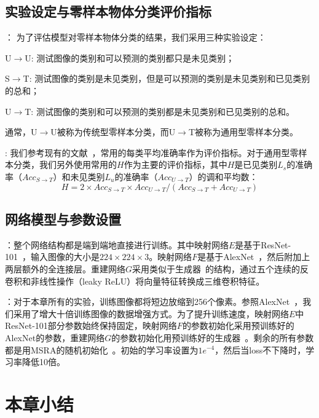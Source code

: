 \subsection{实验设定与零样本物体分类评价指标}
：
为了评估模型对零样本物体分类的结果，我们采用三种实验设定：
\begin{asparaenum}
\item U$\to$U: 测试图像的类别和可以预测的类别都只是未见类别；

\item S$\to$T: 测试图像的类别是未见类别，但是可以预测的类别是未见类别和已见类别的总和；

\item U$\to$T: 测试图像的类别和可以预测的类别都是未见类别和已见类别的总和。
\end{asparaenum}
通常，U$\to$U被称为传统型零样本分类，而U$\to$T被称为通用型零样本分类。

:
我们参考现有的文献~\cite{xian2017zero}，常用的每类平均准确率作为评价指标。对于通用型零样本分类，我们另外使用常用的$H$作为主要的评价指标，其中$H$是已见类别$L_s$的准确率（$Acc_{S\rightarrow T}$）和未见类别$L_u$的准确率（$Acc_{U\rightarrow T}$）的调和平均数：
\begin{equation} \label{ch3:equ:H}
H = 2\times Acc_{S\rightarrow T}\times Acc_{U\rightarrow T} /(Acc_{S\rightarrow T}+Acc_{U\rightarrow T})
\end{equation}

\subsection{网络模型与参数设置}
：整个网络结构都是端到端地直接进行训练。其中映射网络$E$是基于ResNet-101~\cite{he2016deep}，输入图像的大小是$224\times224\times3$。映射网络$F$是基于AlexNet~\cite{krizhevsky2012imagenet}，然后附加上两层额外的全连接层。重建网络$G$采用类似于生成器~\cite{dosovitskiy2016generating}的结构，通过五个连续的反卷积和非线性操作（leaky ReLU）将向量特征转换成三维卷积特征。


：对于本章所有的实验，训练图像都将短边放缩到256个像素。参照AlexNet~\cite{krizhevsky2012imagenet}，我们采用了增大十倍训练图像的数据增强方式。为了提升训练速度，映射网络$E$中ResNet-101部分参数始终保持固定，映射网络$F$的参数初始化采用预训练好的AlexNet的参数，重建网络$G$的参数初始化用预训练好的生成器~\cite{dosovitskiy2016generating}。剩余的所有参数都是用MSRA的随机初始化~\cite{he2015delving}。初始的学习率设置为$1e^{-4}$，然后当loss不下降时，学习率降低10倍。


\section{本章小结}
